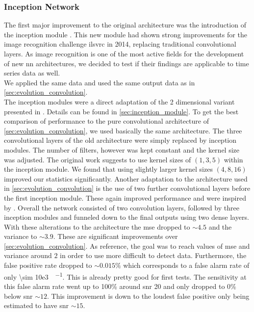 \subsubsection{Inception Network}\label{sec:evolution_inception}
The first major improvement to the original architecture was the introduction of the inception module \cite{inception_module}. This new module had shown strong improvements for the image recognition challenge \gls{ilsvrc} in 2014, replacing traditional convolutional layers. As image recognition is one of the most active fields for the development of new \gls{nn} architectures, we decided to test if their findings are applicable to time series data as well.\\
We applied the same data and used the same output data as in \autoref{sec:evolution_convolution}.\\
The inception modules were a direct adaptation of the 2 dimensional variant presented in \cite{inception_module}. Details can be found in \autoref{sec:inception_module}. To get the best comparison of performance to the pure convolutional architecture of \autoref{sec:evolution_convolution}, we used basically the same architecture. The three convolutional layers of the old architecture were simply replaced by inception modules. The number of filters, however was kept constant and the kernel size was adjusted. The original work suggests to use kernel sizes of $(1,3,5)$ within the inception module. We found that using slightly larger kernel sizes $(4,8,16)$ improved our statistics significantly. Another adaptation to the architecture used in \autoref{sec:evolution_convolution} is the use of two further convolutional layers before the first inception module. These again improved performance and were inspired by \cite{inception_module}. Overall the network consisted of two convolution layers, followed by three inception modules and funneled down to the final outputs using two dense layers.\\
With these alterations to the architecture the \gls{mse} dropped to $\sim 4.5$ and the variance to $\sim 3.9$. These are significant improvements over \autoref{sec:evolution_convolution}. As reference, the goal was to reach values of \gls{mse} and variance around $2$ in order to use more difficult to detect data. Furthermore, the false positive rate dropped to $\sim 0.015\%$ which corresponds to a false alarm rate of only \SI[per-mode=fraction]{\sim 10e3}{\samples\per\month}. This is already pretty good for first tests. The sensitivity at this false alarm rate went up to 100\% around \gls{snr} 20 and only dropped to 0\% below \gls{snr} $\sim 12$. This improvement is down to the loudest false positive only being estimated to have \gls{snr} $\sim 15$.\\

